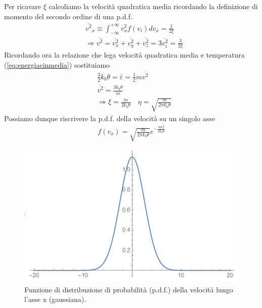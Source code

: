 \documentclass[10pt,a4paper]{article}
\begin{document}
Per ricavare $\xi$ calcoliamo la velocità quadratica media ricordando la definizione di momento del secondo ordine di una p.d.f.
\begin{align*} 
	&\overline{v^2}_x \equiv \int_{-\infty}^{+\infty} v_x^2 f(v_i)dv_x = \frac{1}{2\xi}\\
	&\Rightarrow \overline{v^2} = \overline{v_x^2}+\overline{v_y^2}+\overline{v_z^2} = 3\overline{ v_i^2} = \frac{3}{2\xi}
\end{align*} 
Ricordando ora la relazione che lega velocità quadratica media e temperatura (\ref{eq:energiacinmedia}) sostituiamo
\begin{align*} 
	&\frac{3}{2} k_b \theta = \overline{\varepsilon} = \frac{1}{2} m \overline{v^2}\\
	&\overline{v^2} = \frac{3k_b\theta}{m}\\
	&\Rightarrow \xi = \frac{m}{2k_b\theta} \quad \eta = \sqrt{\frac{m}{2\pi k_b \theta}}
\end{align*} 
Possiamo dunque riscrivere la p.d.f. della velocità su un singolo asse
\begin{align*} 
	f(v_x) = \sqrt{\frac{m}{2\pi k_b\theta}} e^{-\frac{m v_x^2}{2 k_b \theta}}
\end{align*} 
\begin{figure}[h!]
	\centering
	\includegraphics[width=0.6\linewidth]{../images/gausspdf}
	\caption{Funzione di distribuzione di probabilità (p.d.f.) della velocità lungo l'asse x (gaussiana).}
	\label{fig:gausspdf}
\end{figure}
\FloatBarrier
\end{document}
